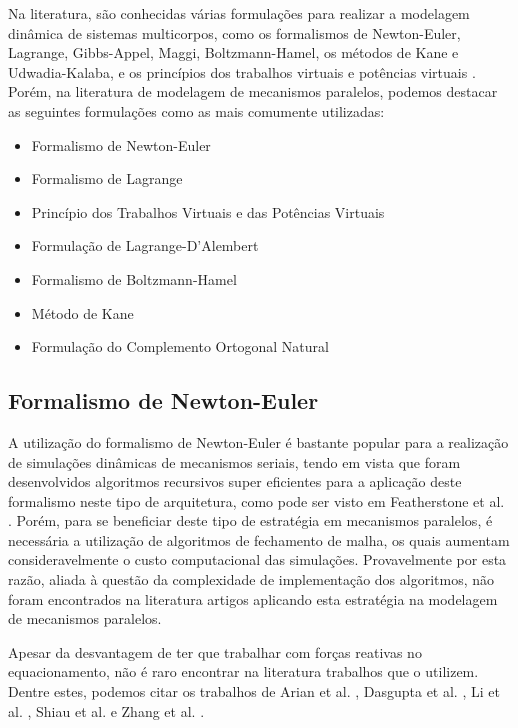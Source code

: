 \documentclass[]{politex}
\begin{document}
Na literatura, são conhecidas várias formulações para realizar a modelagem dinâmica de sistemas multicorpos, como os formalismos de Newton-Euler, Lagrange, Gibbs-Appel, Maggi, Boltzmann-Hamel, os métodos de Kane e Udwadia-Kalaba, e os princípios dos trabalhos virtuais e potências virtuais \cite{23orsino}. Porém, na literatura de modelagem de mecanismos paralelos, podemos destacar as seguintes formulações como as mais comumente utilizadas:

\begin{itemize}
\item Formalismo de Newton-Euler
\item Formalismo de Lagrange
\item Princípio dos Trabalhos Virtuais e das Potências Virtuais
\item Formulação de Lagrange-D'Alembert
\item Formalismo de Boltzmann-Hamel
\item Método de Kane
\item Formulação do Complemento Ortogonal Natural
\end{itemize}

\subsection{Formalismo de Newton-Euler}

A utilização do formalismo de Newton-Euler é bastante popular para a realização de simulações dinâmicas de mecanismos seriais, tendo em vista que foram desenvolvidos algoritmos recursivos super eficientes para a aplicação deste formalismo neste tipo de arquitetura, como pode ser visto em Featherstone et al. \cite{Featherstone}. Porém, para se beneficiar deste tipo de estratégia em mecanismos paralelos, é necessária a utilização de algoritmos de fechamento de malha, os quais aumentam consideravelmente o custo computacional das simulações. Provavelmente por esta razão, aliada à questão da complexidade de implementação dos algoritmos, não foram encontrados na literatura artigos aplicando esta estratégia na modelagem de mecanismos paralelos. 

Apesar da desvantagem de ter que trabalhar com forças reativas no equacionamento, não é raro encontrar na literatura trabalhos que o utilizem. Dentre estes, podemos citar os trabalhos de Arian et al. \cite{Arian}, Dasgupta et al. \cite{Dasgupta}, Li et al. \cite{LiWang}, Shiau et al. \cite{Shiau} e Zhang et al. \cite{Zhang}.
\end{document}
